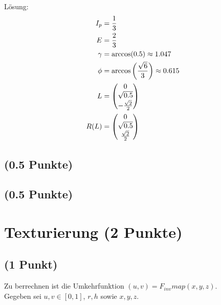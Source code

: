 \documentclass[a4paper,10pt,DIV=14]{article}
\begin{document}
Lösung:
\begin{align*}
I_p &= \frac{1}{3}\\
E &= \frac{2}{3} \\
\gamma &= \arccos(0.5) \approx 1.047\\
\phi &= \arccos\left(\frac{\sqrt{6}}{3}\right) \approx 0.615 \\
L &=  \begin{pmatrix} 0 \\ \sqrt{0.5} \\ -\frac{\sqrt{2}}{2} \end{pmatrix} \\
R(L) &= \begin{pmatrix} 0 \\ \sqrt{0.5} \\ \frac{\sqrt{2}}{2} \end{pmatrix}\\
\end{align*}

\subsection{(0.5 Punkte)} %
\subsection{(0.5 Punkte)}



\clearpage
\section{Texturierung (2 Punkte)} %

\subsection{(1 Punkt)} %


Zu berrechnen ist die Umkehrfunktion $(u,v) = F_{inv} map(x,y,z)$.\\

Gegeben sei $u,v \in [0,1]$, $r, h$ sowie $x,y,z$.\\
\end{document}
